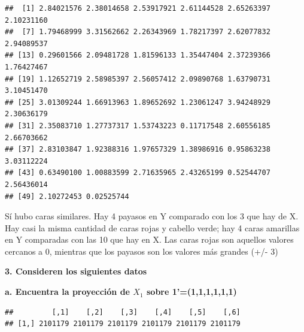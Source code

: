\documentclass[
]{article}
\newenvironment{Shaded}{\begin{snugshade}}{\end{snugshade}}
\newcommand{\CommentTok}[1]{\textcolor[rgb]{0.56,0.35,0.01}{\textit{#1}}}
\newcommand{\DecValTok}[1]{\textcolor[rgb]{0.00,0.00,0.81}{#1}}
\newcommand{\KeywordTok}[1]{\textcolor[rgb]{0.13,0.29,0.53}{\textbf{#1}}}
\newcommand{\NormalTok}[1]{#1}
\newcommand{\OperatorTok}[1]{\textcolor[rgb]{0.81,0.36,0.00}{\textbf{#1}}}
\newcommand{\StringTok}[1]{\textcolor[rgb]{0.31,0.60,0.02}{#1}}
\begin{document}
\begin{verbatim}
##  [1] 2.84021576 2.38014658 2.53917921 2.61144528 2.65263397 2.10231160
##  [7] 1.79468999 3.31562662 2.26343969 1.78217397 2.62077832 2.94089537
## [13] 0.29601566 2.09481728 1.81596133 1.35447404 2.37239366 1.76427467
## [19] 1.12652719 2.58985397 2.56057412 2.09890768 1.63790731 3.10451470
## [25] 3.01309244 1.66913963 1.89652692 1.23061247 3.94248929 2.30636179
## [31] 2.35083710 1.27737317 1.53743223 0.11717548 2.60556185 2.66703662
## [37] 2.83103847 1.92388316 1.97657329 1.38986916 0.95863238 3.03112224
## [43] 0.63490100 1.00883599 2.71635965 2.43265199 0.52544707 2.56436014
## [49] 2.10272453 0.02525744
\end{verbatim}

Sí hubo caras similares. Hay 4 payasos en Y comparado con los 3 que hay
de X. Hay casi la misma cantidad de caras rojas y cabello verde; hay 4
caras amarillas en Y comparadas con las 10 que hay en X. Las caras rojas
son aquellos valores cercanos a 0, mientras que los payasos son los
valores más grandes (+/- 3)

\textbf{3. Consideren los siguientes datos}

\textbf{a. Encuentra la proyección de \(X_1\) sobre 1'=(1,1,1,1,1,1)}

\begin{Shaded}
\end{Shaded}

\begin{verbatim}
##         [,1]    [,2]    [,3]    [,4]    [,5]    [,6]
## [1,] 2101179 2101179 2101179 2101179 2101179 2101179
\end{verbatim}
\end{document}
